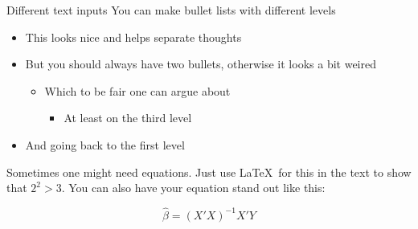 \documentclass[11pt, aspectratio=169, t]{beamer}
\def\tightlist{}
\providecommand{\tightlist}{%
	\setlength{\itemsep}{0pt}\setlength{\parskip}{0pt}}
\begin{document}
\begin{frame}{Different text inputs}
\label{different-text-inputs}
You can make bullet lists with different levels

\begin{itemize}
\tightlist
\item
  This looks nice and helps separate thoughts
\item
  But you should always have two bullets, otherwise it looks a bit
  weired

  \begin{itemize}
  \tightlist
  \item
    Which to be fair one can argue about

    \begin{itemize}
    \tightlist
    \item
      At least on the third level
    \end{itemize}
  \end{itemize}
\item
  And going back to the first level
\end{itemize}

Sometimes one might need equations. Just use \LaTeX~for this in the text
to show that \(2^{2} > 3\). You can also have your equation stand out
like this:

\[\hat{\beta} = (X'X)^{-1} X'Y\]
\end{frame}
\end{document}
